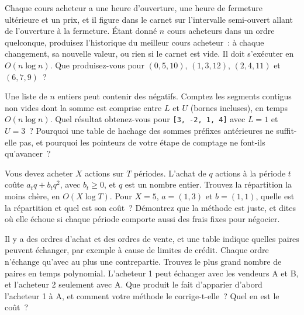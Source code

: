 \begin{question}\label{iq:iv3:algorithms:72}
Chaque cours acheteur a une heure d'ouverture, une heure de fermeture ultérieure et un prix, et il figure dans le carnet sur l'intervalle semi-ouvert allant de l'ouverture à la fermeture. Étant donné $n$ cours acheteurs dans un ordre quelconque, produisez l'historique du meilleur cours acheteur~: à chaque changement, sa nouvelle valeur, ou rien si le carnet est vide. Il doit s'exécuter en $O(n \log n)$. Que produisez-vous pour $(0, 5, 10)$, $(1, 3, 12)$, $(2, 4, 11)$ et $(6, 7, 9)$~?
\end{question}

\begin{question}\label{iq:iv3:algorithms:73}
Une liste de $n$ entiers peut contenir des négatifs. Comptez les segments contigus non vides dont la somme est comprise entre $L$ et $U$ (bornes incluses), en temps $O(n \log n)$. Quel résultat obtenez-vous pour \texttt{[3, -2, 1, 4]} avec $L = 1$ et $U = 3$~? Pourquoi une table de hachage des sommes préfixes antérieures ne suffit-elle pas, et pourquoi les pointeurs de votre étape de comptage ne font-ils qu'avancer~?
\end{question}

\begin{question}\label{iq:iv3:algorithms:74}
Vous devez acheter $X$ actions sur $T$ périodes. L'achat de $q$ actions à la période $t$ coûte $a_t q + b_t q^2$, avec $b_t \ge 0$, et $q$ est un nombre entier. Trouvez la répartition la moins chère, en $O(X \log T)$. Pour $X = 5$, $a = (1, 3)$ et $b = (1, 1)$, quelle est la répartition et quel est son coût~? Démontrez que la méthode est juste, et dites où elle échoue si chaque période comporte aussi des frais fixes pour négocier.
\end{question}

\begin{question}\label{iq:iv3:algorithms:75}
Il y a des ordres d'achat et des ordres de vente, et une table indique quelles paires peuvent échanger, par exemple à cause de limites de crédit. Chaque ordre n'échange qu'avec au plus une contrepartie. Trouvez le plus grand nombre de paires en temps polynomial. L'acheteur 1 peut échanger avec les vendeurs A et B, et l'acheteur 2 seulement avec A. Que produit le fait d'apparier d'abord l'acheteur 1 à A, et comment votre méthode le corrige-t-elle~? Quel en est le coût~?
\end{question}

